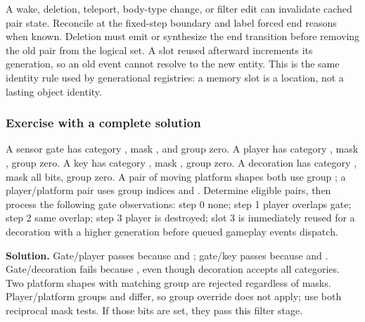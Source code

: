 A wake, deletion, teleport, body-type change, or filter edit can invalidate cached pair state. Reconcile at the fixed-step boundary and label forced end reasons when known. Deletion must emit or synthesize the end transition before removing the old pair from the logical set. A slot reused afterward increments its generation, so an old  event cannot resolve to the new  entity. This is the same identity rule used by generational registries: a memory slot is a location, not a lasting object identity.

\begin{allmightroleexercise}

\subsubsection{Exercise with a complete solution}\label{05-engine-i-ch017-exercise-with-a-complete-solution}

\hypertarget{05-engine-i-ch017-exercise-with-a-complete-solution}{}

A sensor gate has category , mask , and group zero. A player has category , mask , group zero. A key has category , mask , group zero. A decoration has category , mask all bits, group zero. A pair of moving platform shapes both use group ; a player/platform pair uses group indices  and . Determine eligible pairs, then process the following gate observations: step 0 none; step 1 player overlaps gate; step 2 same overlap; step 3 player is destroyed; slot 3 is immediately reused for a decoration with a higher generation before queued gameplay events dispatch.

\end{allmightroleexercise}

\textbf{Solution.} Gate/player passes because  and ; gate/key passes because  and . Gate/decoration fails because , even though decoration accepts all categories. Two platform shapes with matching group  are rejected regardless of masks. Player/platform groups  and  differ, so group override does not apply; use both reciprocal mask tests. If those bits are set, they pass this filter stage.


